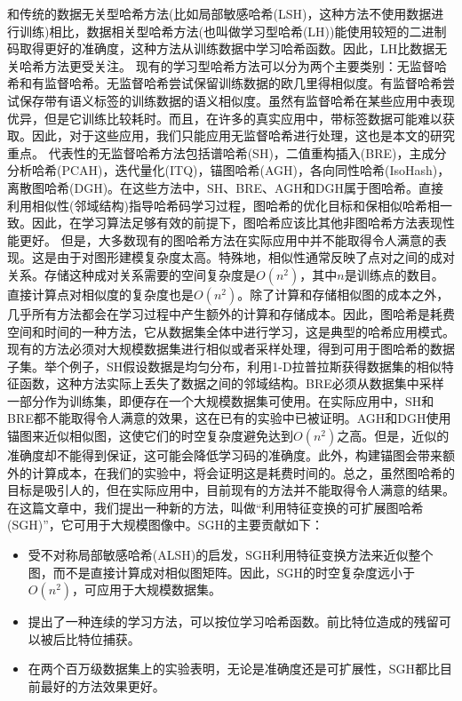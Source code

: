 \message{ !name(SGH.tex)}\documentclass[prodmode,acmtecs]{acmsmall}
\begin{document}
和传统的数据无关型哈希方法(比如局部敏感哈希(LSH)\cite{Gionis:1999:SSH:645925.671516,Datar:2004:LHS:997817.997857}，这种方法不使用数据进行训练)相比，数据相关型哈希方法(也叫做学习型哈希(LH))能使用较短的二进制码取得更好的准确度，这种方法从训练数据中学习哈希函数\cite{PMID:24136430,6247912,Zhang2014SHL,NIPS2014_5332}。因此，LH比数据无关哈希方法更受关注\cite{icml2010_WangKC10,PMID:24136430,6247912,Zhang2014SHL,6909650,NIPS2014_5332}。
现有的学习型哈希方法可以分为两个主要类别\cite{PMID:24136430,6247912,Zhang2014SHL}：无监督哈希和有监督哈希。无监督哈希尝试保留训练数据的欧几里得相似度。有监督哈希\cite{ICML2011Norouzi_246,Zhang2014SHL,6909650}尝试保存带有语义标签的训练数据的语义相似度。虽然有监督哈希在某些应用中表现优异，但是它训练比较耗时。而且，在许多的真实应用中，带标签数据可能难以获取。因此，对于这些应用，我们只能应用无监督哈希进行处理，这也是本文的研究重点。
代表性的无监督哈希方法包括谱哈希(SH)\cite{NIPS2008_3383}，二值重构插入(BRE)\cite{Kulis2010Learning}，主成分分析哈希(PCAH)\cite{PMID:24136430}，迭代量化(ITQ)\cite{PMID:24136430}，锚图哈希(AGH)\cite{Liu2011Hashing}，各向同性哈希(IsoHash)\cite{W2012Isotropic}，离散图哈希(DGH)\cite{NIPS2014_5332}。在这些方法中，SH、BRE、AGH和DGH属于图哈希。直接利用相似性(邻域结构)指导哈希码学习过程，图哈希的优化目标和保相似哈希相一致。因此，在学习算法足够有效的前提下，图哈希应该比其他非图哈希方法表现性能更好。
但是，大多数现有的图哈希方法在实际应用中并不能取得令人满意的表现。这是由于对图形建模复杂度太高。特殊地，相似性通常反映了点对之间的成对关系。存储这种成对关系需要的空间复杂度是$O(n^2)$，其中$n$是训练点的数目。直接计算点对相似度的复杂度也是$O(n^2)$。除了计算和存储相似图的成本之外，几乎所有方法都会在学习过程中产生额外的计算和存储成本。因此，图哈希是耗费空间和时间的一种方法，它从数据集全体中进行学习，这是典型的哈希应用模式。现有的方法必须对大规模数据集进行相似或者采样处理，得到可用于图哈希的数据子集。举个例子，SH假设数据是均匀分布，利用1-D拉普拉斯获得数据集的相似特征函数，这种方法实际上丢失了数据之间的邻域结构。BRE必须从数据集中采样一部分作为训练集，即便存在一个大规模数据集可使用。在实际应用中，SH和BRE都不能取得令人满意的效果，这在已有的实验中已被证明\cite{Liu2011Hashing}。AGH和DGH使用锚图来近似相似图，这使它们的时空复杂度避免达到$O(n^2)$之高。但是，近似的准确度却不能得到保证，这可能会降低学习码的准确度。此外，构建锚图会带来额外的计算成本，在我们的实验中，将会证明这是耗费时间的。总之，虽然图哈希的目标是吸引人的，但在实际应用中，目前现有的方法并不能取得令人满意的结果。
在这篇文章中，我们提出一种新的方法，叫做“利用特征变换的可扩展图哈希(SGH)”，它可用于大规模图像中。SGH的主要贡献如下：

\begin{itemize}
\item  受不对称局部敏感哈希(ALSH)\cite{NIPS2014_5329}的启发，SGH利用特征变换方法来近似整个图，而不是直接计算成对相似图矩阵。因此，SGH的时空复杂度远小于$O(n^2)$，可应用于大规模数据集。
\item 提出了一种连续的学习方法，可以按位学习哈希函数。前比特位造成的残留可以被后比特位捕获。
 \item 在两个百万级数据集上的实验表明，无论是准确度还是可扩展性，SGH都比目前最好的方法效果更好。
\end{itemize}
\end{document}
